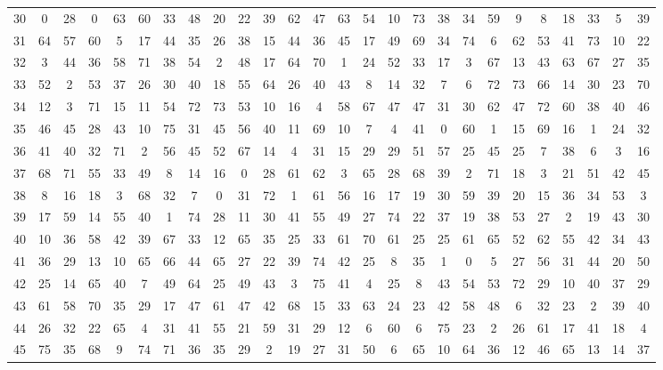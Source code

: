 \begin{table}
\begin{tabular}{c c c c c c c c c c c c c c c c c c c c c c c c c c }
30 & 0 & 28 & 0 & 63 & 60 & 33 & 48 & 20 & 22 & 39 & 62 & 47 & 63 & 54 & 10 & 73 & 38 & 34 & 59 & 9 & 8 & 18 & 33 & 5 & 39 \\
31 & 64 & 57 & 60 & 5 & 17 & 44 & 35 & 26 & 38 & 15 & 44 & 36 & 45 & 17 & 49 & 69 & 34 & 74 & 6 & 62 & 53 & 41 & 73 & 10 & 22 \\
32 & 3 & 44 & 36 & 58 & 71 & 38 & 54 & 2 & 48 & 17 & 64 & 70 & 1 & 24 & 52 & 33 & 17 & 3 & 67 & 13 & 43 & 63 & 67 & 27 & 35 \\
33 & 52 & 2 & 53 & 37 & 26 & 30 & 40 & 18 & 55 & 64 & 26 & 40 & 43 & 8 & 14 & 32 & 7 & 6 & 72 & 73 & 66 & 14 & 30 & 23 & 70 \\
34 & 12 & 3 & 71 & 15 & 11 & 54 & 72 & 73 & 53 & 10 & 16 & 4 & 58 & 67 & 47 & 47 & 31 & 30 & 62 & 47 & 72 & 60 & 38 & 40 & 46 \\
35 & 46 & 45 & 28 & 43 & 10 & 75 & 31 & 45 & 56 & 40 & 11 & 69 & 10 & 7 & 4 & 41 & 0 & 60 & 1 & 15 & 69 & 16 & 1 & 24 & 32 \\
36 & 41 & 40 & 32 & 71 & 2 & 56 & 45 & 52 & 67 & 14 & 4 & 31 & 15 & 29 & 29 & 51 & 57 & 25 & 45 & 25 & 7 & 38 & 6 & 3 & 16 \\
37 & 68 & 71 & 55 & 33 & 49 & 8 & 14 & 16 & 0 & 28 & 61 & 62 & 3 & 65 & 28 & 68 & 39 & 2 & 71 & 18 & 3 & 21 & 51 & 42 & 45 \\
38 & 8 & 16 & 18 & 3 & 68 & 32 & 7 & 0 & 31 & 72 & 1 & 61 & 56 & 16 & 17 & 19 & 30 & 59 & 39 & 20 & 15 & 36 & 34 & 53 & 3 \\
39 & 17 & 59 & 14 & 55 & 40 & 1 & 74 & 28 & 11 & 30 & 41 & 55 & 49 & 27 & 74 & 22 & 37 & 19 & 38 & 53 & 27 & 2 & 19 & 43 & 30 \\
40 & 10 & 36 & 58 & 42 & 39 & 67 & 33 & 12 & 65 & 35 & 25 & 33 & 61 & 70 & 61 & 25 & 25 & 61 & 65 & 52 & 62 & 55 & 42 & 34 & 43 \\
41 & 36 & 29 & 13 & 10 & 65 & 66 & 44 & 65 & 27 & 22 & 39 & 74 & 42 & 25 & 8 & 35 & 1 & 0 & 5 & 27 & 56 & 31 & 44 & 20 & 50 \\
42 & 25 & 14 & 65 & 40 & 7 & 49 & 64 & 25 & 49 & 43 & 3 & 75 & 41 & 4 & 25 & 8 & 43 & 54 & 53 & 72 & 29 & 10 & 40 & 37 & 29 \\
43 & 61 & 58 & 70 & 35 & 29 & 17 & 47 & 61 & 47 & 42 & 68 & 15 & 33 & 63 & 24 & 23 & 42 & 58 & 48 & 6 & 32 & 23 & 2 & 39 & 40 \\
44 & 26 & 32 & 22 & 65 & 4 & 31 & 41 & 55 & 21 & 59 & 31 & 29 & 12 & 6 & 60 & 6 & 75 & 23 & 2 & 26 & 61 & 17 & 41 & 18 & 4 \\
45 & 75 & 35 & 68 & 9 & 74 & 71 & 36 & 35 & 29 & 2 & 19 & 27 & 31 & 50 & 6 & 65 & 10 & 64 & 36 & 12 & 46 & 65 & 13 & 14 & 37 \\

\end{tabular}
\end{table}
